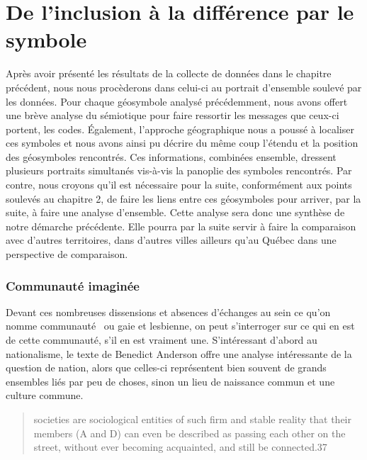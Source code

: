 
\chapter{De l'inclusion à la différence par le symbole}
\label{cha:de_l_inclusion_la_diff_rence_par_le_symbole}

Après avoir présenté les résultats de la collecte de données dans le chapitre précédent, nous nous procèderons dans celui-ci au portrait d'ensemble soulevé par les données.
Pour chaque géosymbole analysé précédemment, nous avons offert une brève analyse du sémiotique pour faire ressortir les messages que ceux-ci portent, les codes.
Également, l'approche géographique nous a poussé à localiser ces symboles et nous avons ainsi pu décrire du même coup l'étendu et la position des géosymboles rencontrés.
Ces informations, combinées ensemble, dressent plusieurs portraits simultanés vis-à-vis la panoplie des symboles rencontrés.
Par contre, nous croyons qu'il est nécessaire pour la suite, conformément aux points soulevés au chapitre 2, de faire les liens entre ces géosymboles pour arriver, par la suite, à faire une analyse d'ensemble.
Cette analyse sera donc une synthèse de notre démarche précédente.
Elle pourra par la suite servir à faire la comparaison avec d'autres territoires, dans d'autres villes ailleurs qu'au Québec dans une perspective de comparaison.


\subsection{Communauté imaginée}
\label{sub:communaut_imagin_e}
Devant ces nombreuses dissensions et absences d'échanges au sein ce qu'on nomme communauté~\lgbt{} ou gaie et lesbienne, on peut s'interroger sur ce qui en est de cette communauté, s'il en est vraiment une.
S'intéressant d'abord au nationalisme, le texte de Benedict Anderson offre une analyse intéressante de la question de nation, alors que celles-ci représentent bien souvent de grands ensembles liés par peu de choses, sinon un lieu de naissance commun et une culture commune.
\begin{quote}	
societies are sociological entities of such firm and stable reality that their members (A and D) can even be described as passing each other on the street, without ever becoming acquainted, and still be connected.37 \citep{Anderson1983}
\end{quote}

